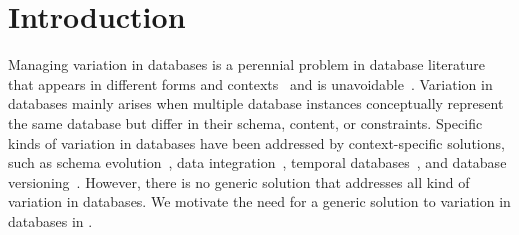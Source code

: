 \chapter{Introduction}
\label{ch:intro}

%


Managing variation in databases is a perennial problem in database literature
that appears in different forms and 
contexts~\cite{curateVdata,ALW21vamos,ready17cidr,clams16sigmod,datahub15cidr}
and is unavoidable~\cite{dbDecay16Stonebraker}.
%
Variation in databases mainly arises when multiple database instances 
conceptually represent the same database but differ
in their schema, content, or constraints.
%
Specific kinds of variation in databases have been addressed by 
context-specific solutions, such as
schema evolution~\cite{SchEvolRA90McKenzie, 
schVersioning97Castro, tempSchEvol91Ariav, tsql95Snodgrass, 
prima08Moon}, 
data integration~\cite{dataIntegBook}, 
temporal databases~\cite{tempDataMng, tempDBSurv, tempDBbook},
and database versioning~\cite{datasetVersioning,dbVersioning}.
%
However, there is no generic solution that addresses all kind of variation
in databases. We motivate the need for a generic solution to variation
in databases in .
%


